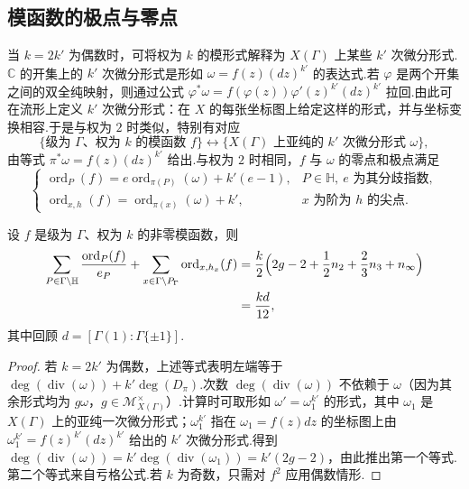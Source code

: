 \subsection{模函数的极点与零点}\label{sec:modular-1-2-4}
当 $k=2k'$ 为偶数时，可将权为 $k$ 的模形式解释为 $X(\Gamma)$ 上某些 $k'$ 次微分形式.$\mathbb C$ 的开集上的 $k'$ 次微分形式是形如 $\omega=f(z)(dz)^{k'}$ 的表达式.若 $\varphi$ 是两个开集之间的双全纯映射，则通过公式 $\varphi^*\omega=f(\varphi(z))\varphi'(z)^{k'}(dz)^{k'}$ 拉回.由此可在流形上定义 $k'$ 次微分形式：在 $X$ 的每张坐标图上给定这样的形式，并与坐标变换相容.于是与权为 $2$ 时类似，特别有对应
\[
\{\text{级为 }\Gamma\text{、权为 }k\text{ 的模函数 }f\}\longleftrightarrow
\{X(\Gamma)\text{ 上亚纯的 }k'\text{ 次微分形式 }\omega\},
\]
由等式 $\pi^*\omega=f(z)(dz)^{k'}$ 给出.与权为 $2$ 时相同，$f$ 与 $\omega$ 的零点和极点满足
\[
\begin{cases}
\operatorname{ord}_P(f)=e\operatorname{ord}_{\pi(P)}(\omega)+k'(e-1),&P\in\mathbb H,\ e\text{ 为其分歧指数},\\
\operatorname{ord}_{x,h}(f)=\operatorname{ord}_{\pi(x)}(\omega)+k',&x\text{ 为阶为 }h\text{ 的尖点}.
\end{cases}
\]
\begin{proposition*}
设 $f$ 是级为 $\Gamma$、权为 $k$ 的非零模函数，则
\begin{align*}
\sum_{P\in\Gamma\backslash\mathbb H}\frac{\operatorname{ord}_P(f)}{e_P}+\sum_{x\in\Gamma\backslash P_\Gamma}\operatorname{ord}_{x,h_x}(f)
&=\frac k2\Bigl(2g-2+\frac12n_2+\frac23n_3+n_\infty\Bigr)\\
&=\frac{kd}{12},
\end{align*}
其中回顾 $d=[\Gamma(1):\Gamma\{\pm1\}]$.
\end{proposition*}
\begin{proof}
若 $k=2k'$ 为偶数，上述等式表明左端等于 $\deg(\operatorname{div}(\omega))+k'\deg(D_\pi)$.次数 $\deg(\operatorname{div}(\omega))$ 不依赖于 $\omega$（因为其余形式均为 $g\omega$，$g\in\mathcal M_{X(\Gamma)}^\times$）.计算时可取形如 $\omega'=\omega_1^{k'}$ 的形式，其中 $\omega_1$ 是 $X(\Gamma)$ 上的亚纯一次微分形式；$\omega_1^{k'}$ 指在 $\omega_1=f(z)dz$ 的坐标图上由 $\omega_1^{k'}=f(z)^{k'}(dz)^{k'}$ 给出的 $k'$ 次微分形式.得到 $\deg(\operatorname{div}(\omega))=k'\deg(\operatorname{div}(\omega_1))=k'(2g-2)$，由此推出第一个等式.第二个等式来自亏格公式.若 $k$ 为奇数，只需对 $f^2$ 应用偶数情形.
\end{proof}
